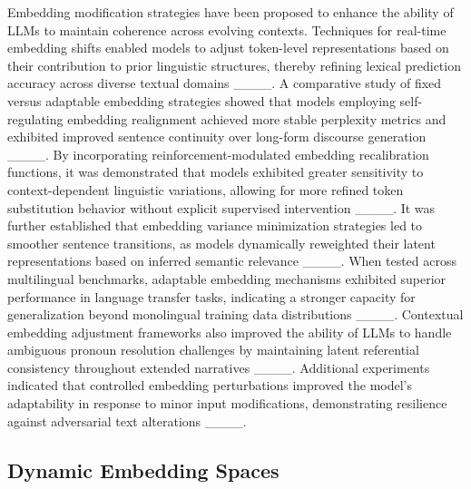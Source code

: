 Embedding modification strategies have been proposed to enhance the ability of LLMs to maintain coherence across evolving contexts. Techniques for real-time embedding shifts enabled models to adjust token-level representations based on their contribution to prior linguistic structures, thereby refining lexical prediction accuracy across diverse textual domains ____. A comparative study of fixed versus adaptable embedding strategies showed that models employing self-regulating embedding realignment achieved more stable perplexity metrics and exhibited improved sentence continuity over long-form discourse generation ____. By incorporating reinforcement-modulated embedding recalibration functions, it was demonstrated that models exhibited greater sensitivity to context-dependent linguistic variations, allowing for more refined token substitution behavior without explicit supervised intervention ____. It was further established that embedding variance minimization strategies led to smoother sentence transitions, as models dynamically reweighted their latent representations based on inferred semantic relevance ____. When tested across multilingual benchmarks, adaptable embedding mechanisms exhibited superior performance in language transfer tasks, indicating a stronger capacity for generalization beyond monolingual training data distributions ____. Contextual embedding adjustment frameworks also improved the ability of LLMs to handle ambiguous pronoun resolution challenges by maintaining latent referential consistency throughout extended narratives ____. Additional experiments indicated that controlled embedding perturbations improved the model’s adaptability in response to minor input modifications, demonstrating resilience against adversarial text alterations ____.

\subsection{Dynamic Embedding Spaces}

